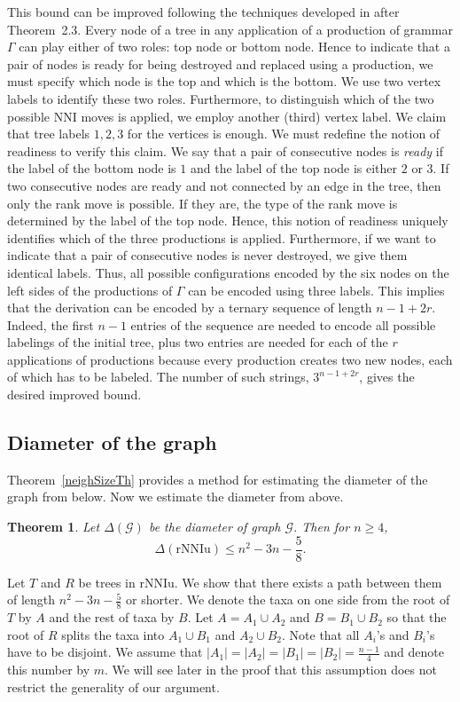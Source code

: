 \documentclass{amsart}
\newtheorem{theorem}[lemma]{Theorem}
\theoremstyle{definition}
\newcommand{\nni}{\mathrm{NNI}}
\newcommand{\rnniu}{\mathrm{rNNIu}}
\newcommand{\G}{\mathcal{G}}
\begin{document}
This bound can be improved following the techniques developed in \autocite{Sleator1992-bp} after Theorem~2.3.
Every node of a tree in any application of a production of grammar $\Gamma$ can play either of two roles: top node or bottom node.
Hence to indicate that a pair of nodes is ready for being destroyed and replaced using a production, we must specify which node is the top and which is the bottom.
We use two vertex labels to identify these two roles.
Furthermore, to distinguish which of the two possible $\nni$ moves is applied, we employ another (third) vertex label.
We claim that tree labels $1,2,3$ for the vertices is enough.
We must redefine the notion of readiness to verify this claim.
We say that a pair of consecutive nodes is \emph{ready} if the label of the bottom node is $1$ and the label of the top node is either $2$ or $3$.
If two consecutive nodes are ready and not connected by an edge in the tree, then only the rank move is possible.
If they are, the type of the rank move is determined by the label of the top node.
Hence, this notion of readiness uniquely identifies which of the three productions is applied.
Furthermore, if we want to indicate that a pair of consecutive nodes is never destroyed, we give them identical labels.
Thus, all possible configurations encoded by the six nodes on the left sides of the productions of $\Gamma$ can be encoded using three labels.
This implies that the derivation can be encoded by a ternary sequence of length $n-1+2r$.
Indeed, the first $n-1$ entries of the sequence are needed to encode all possible labelings of the initial tree, plus two entries are needed for each of the $r$ applications of productions because every production creates two new nodes, each of which has to be labeled.
The number of such strings, $3^{n-1+2r}$, gives the desired improved bound.
\endproof


\subsection{Diameter of the graph}

Theorem~\ref{neighSizeTh} provides a method for estimating the diameter of the graph from below.
Now we estimate the diameter from above.

\begin{theorem}\label{diameterUpperBound}
Let $\Delta(\G)$ be the diameter of graph $\G$.
Then for $n \ge 4$,
\[
\Delta(\rnniu) \le n^2 - 3n - \frac 58.
\]
\end{theorem}

\proof
Let $T$ and $R$ be trees in $\rnniu$.
We show that there exists a path between them of length $n^2 - 3n - \frac 58$ or shorter.
We denote the taxa on one side from the root of $T$ by $A$ and the rest of taxa by $B$.
Let $A = A_1 \cup A_2$ and $B = B_1 \cup B_2$ so that the root of $R$ splits the taxa into $A_1 \cup B_1$ and $A_2 \cup B_2$.
Note that all $A_i$'s and $B_i$'s have to be disjoint.
We assume that $|A_1| = |A_2| = |B_1| = |B_2| = \frac{n-1}{4}$ and denote this number by $m$.
We will see later in the proof that this assumption does not restrict the generality of our argument.
\end{document}
